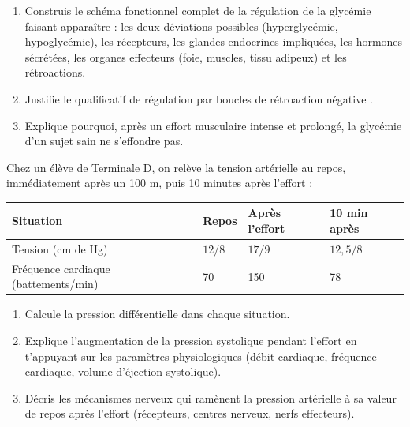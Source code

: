 \documentclass[11pt]{article}
\begin{document}
\begin{exercice}
\begin{enumerate}
\item Construis le schéma fonctionnel complet de la régulation de la glycémie faisant apparaître : les deux déviations possibles (hyperglycémie, hypoglycémie), les récepteurs, les glandes endocrines impliquées, les hormones sécrétées, les organes effecteurs (foie, muscles, tissu adipeux) et les rétroactions.
\item Justifie le qualificatif de \og régulation par boucles de rétroaction négative \fg{}.
\item Explique pourquoi, après un effort musculaire intense et prolongé, la glycémie d'un sujet sain ne s'effondre pas.
\end{enumerate}
\end{exercice}

\begin{exercice}
Chez un élève de Terminale D, on relève la tension artérielle au repos, immédiatement après un 100 m, puis 10 minutes après l'effort :
\begin{center}
\begin{tabularx}{\linewidth}{|l|X|X|X|}\hline
\rowcolor{popblueL} Situation & Repos & Après l'effort & 10 min après \\ \hline
Tension (cm de Hg) & $12/8$ & $17/9$ & $12{,}5/8$ \\ \hline
Fréquence cardiaque (battements/min) & 70 & 150 & 78 \\ \hline
\end{tabularx}
\end{center}
\begin{enumerate}
\item Calcule la pression différentielle dans chaque situation.
\item Explique l'augmentation de la pression systolique pendant l'effort en t'appuyant sur les paramètres physiologiques (débit cardiaque, fréquence cardiaque, volume d'éjection systolique).
\item Décris les mécanismes nerveux qui ramènent la pression artérielle à sa valeur de repos après l'effort (récepteurs, centres nerveux, nerfs effecteurs).
\end{enumerate}
\end{exercice}
\end{document}
